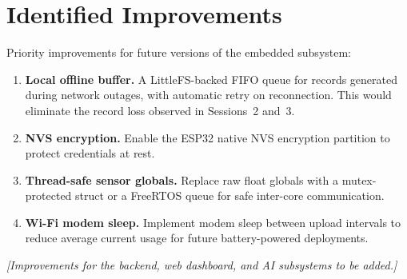\section{Identified Improvements}

Priority improvements for future versions of the embedded subsystem:

\begin{enumerate}
	\item \textbf{Local offline buffer.}
	      A LittleFS-backed FIFO queue for records generated during network outages,
	      with automatic retry on reconnection.
	      This would eliminate the record loss observed in Sessions~2 and~3.

	\item \textbf{NVS encryption.}
	      Enable the ESP32 native NVS encryption partition to protect credentials at rest.

	\item \textbf{Thread-safe sensor globals.}
	      Replace raw float globals with a mutex-protected struct or a FreeRTOS queue
	      for safe inter-core communication.

	\item \textbf{Wi-Fi modem sleep.}
	      Implement modem sleep between upload intervals to reduce average current usage for future battery-powered deployments.
\end{enumerate}

\begin{center}
	\textit{[Improvements for the backend, web dashboard, and AI subsystems to be added.]}
\end{center}

